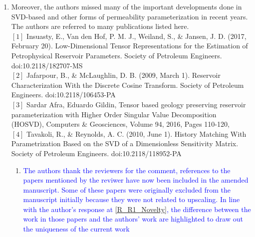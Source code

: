 \documentclass[11pt]{letter} %
\newcommand{\blue}{\textcolor{blue}}
\begin{document}
\begin{letter}
{\begin{enumerate}
\begin{enumerate}
\begin{enumerate}
      \item \label{R_R1_OverSimplification_P1} \blue{The authors thank the reviewer for the comment and acknowledges that the work may be interpreted as over-simplified from the initial manuscript presented. A simplistic approach for presenting the work was initially favoured by the authors to avoid distraction from the main work and to simplify the findings. In satisfying the reviewer, more details were provided as detailed in the response to \ref{R_R1_Novelty}. Additionally, a set of 3-D simulations were added to the amended manuscript. These changes remove the simplification and the authors also hope they answered the important questions that the reviewer implied remained unanswered. The authors remain willing to provide a direct answer to any unanswered questions which are explicitly stated.}
        \end{enumerate}
    \item \label{R_R1_MissedNewDev}Moreover, the authors missed many of the important developments done in SVD-based and other forms of permeability  parameterization in recent years. The authors are referred to many publications listed here.\\
$[1]$ Insuasty, E., Van den Hof, P. M. J., Weiland, S., \& Jansen, J. D. (2017, February 20). Low-Dimensional Tensor Representations for the Estimation of Petrophysical Reservoir Parameters. Society of Petroleum Engineers. doi:10.2118/182707-MS\\
$[2]$ Jafarpour, B., \& McLaughlin, D. B. (2009, March 1). Reservoir Characterization With the Discrete Cosine Transform. Society of Petroleum Engineers. doi:10.2118/106453-PA\\
$[3]$ Sardar Afra, Eduardo Gildin, Tensor based geology preserving reservoir parameterization with Higher Order Singular Value Decomposition (HOSVD), Computers \& Geosciences, Volume 94, 2016, Pages 110-120,\\
      $[4]$  Tavakoli, R., \& Reynolds, A. C. (2010, June 1). History Matching With Parametrization Based on the SVD of a Dimensionless Sensitivity Matrix. Society of Petroleum Engineers. doi:10.2118/118952-PA
      \begin{enumerate}
      \item \label{R_R1_MissedNewDev_P1} \blue{The authors thank the reviewers for the comment, references to the papers mentioned by the reviwer have now been included in the amended manuscript. Some of these papers were originally excluded from the manuscript initially because they were not related to upscaling. In line with the author's response at \ref{R_R1_Novelty}, the difference between the work in those papers and the authors' work are highlighted to draw out the uniqueness of the current work}

\end{enumerate}
\end{enumerate}
\end{enumerate}}
\end{letter}
\end{document}
